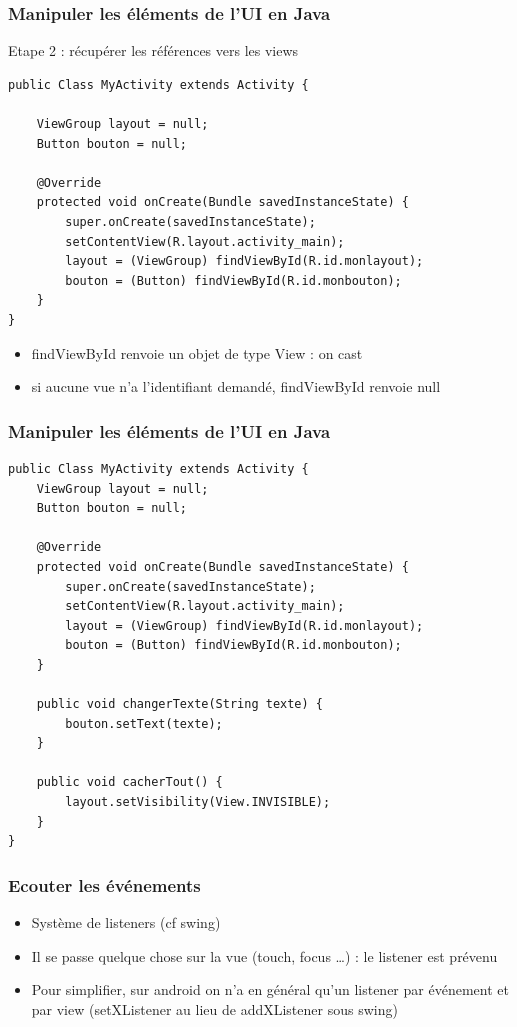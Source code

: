 \documentclass{beamer}
\begin{document}
\begin{frame}[fragile]
\frametitle{Manipuler les éléments de l'UI en Java}
Etape 2 : récupérer les références vers les views
\begin{lstlisting}
public Class MyActivity extends Activity {

    ViewGroup layout = null;
    Button bouton = null;

    @Override
    protected void onCreate(Bundle savedInstanceState) {
        super.onCreate(savedInstanceState);
        setContentView(R.layout.activity_main);
        layout = (ViewGroup) findViewById(R.id.monlayout);
        bouton = (Button) findViewById(R.id.monbouton);
    }
}
\end{lstlisting}
\begin{itemize}
    \item findViewById renvoie un objet de type View : on cast
    \item si aucune vue n'a l'identifiant demandé, findViewById renvoie null
 \end{itemize}
\end{frame}
\begin{frame}[fragile]
\frametitle{Manipuler les éléments de l'UI en Java}
\begin{lstlisting}
public Class MyActivity extends Activity {
    ViewGroup layout = null;
    Button bouton = null;

    @Override
    protected void onCreate(Bundle savedInstanceState) {
        super.onCreate(savedInstanceState);
        setContentView(R.layout.activity_main);
        layout = (ViewGroup) findViewById(R.id.monlayout);
        bouton = (Button) findViewById(R.id.monbouton);
    }
	
    public void changerTexte(String texte) {
        bouton.setText(texte);
    }
	
    public void cacherTout() {
        layout.setVisibility(View.INVISIBLE);
    }
}
\end{lstlisting}
\end{frame}
\begin{frame}[fragile]
\frametitle{Ecouter les événements}
\begin{itemize}
 \item Système de listeners (cf swing)
 \item Il se passe quelque chose sur la vue (touch, focus \ldots) : le listener
 est prévenu
 \item Pour simplifier, sur android on n'a en général qu'un listener par
 événement et par view (setXListener au lieu de addXListener sous swing)
 \end{itemize}
\end{frame}
\end{document}
